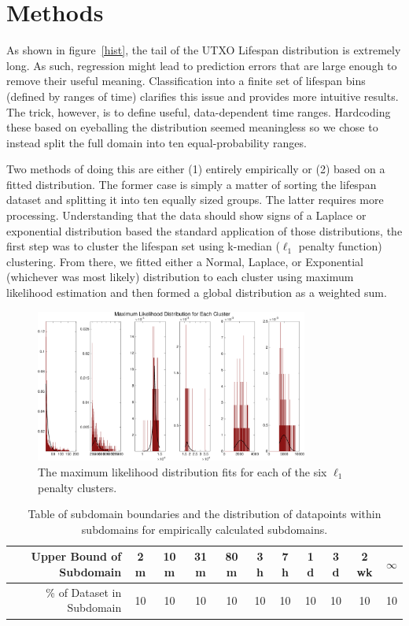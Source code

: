 \documentclass[11pt]{article}
\begin{document}
\section{Methods}
As shown in figure~\ref{hist}, the tail of the UTXO Lifespan distribution is extremely long. As such, regression might lead to prediction errors that are large enough to remove their useful meaning. Classification into a finite set of lifespan bins (defined by ranges of time) clarifies this issue and provides more intuitive results. The trick, however, is to define useful, data-dependent time ranges. Hardcoding these based on eyeballing the distribution seemed meaningless so we chose to instead split the full domain into ten equal-probability ranges.

Two methods of doing this are either (1) entirely empirically or (2) based on a fitted distribution. The former case is simply a matter of sorting the lifespan dataset and splitting it into ten equally sized groups. The latter requires more processing. Understanding that the data should show signs of a Laplace or exponential distribution based the standard application of those distributions, the first step was to cluster the lifespan set using k-median ($\ell_1$ penalty function) clustering. From there, we fitted either a Normal, Laplace, or Exponential (whichever was most likely) distribution to each cluster using maximum likelihood estimation and then formed a global distribution as a weighted sum. 

\begin{figure}
\begin{center}
\includegraphics[width=0.8\textwidth]{figures/fits}
\end{center}
\caption{The maximum likelihood distribution fits for each of the six $\ell_1$ penalty clusters.}
\label{fits}
\end{figure}

\begin{table}[!htbp]
\begin{tabular}{|r||c|c|c|c|c|c|c|c|c|c|}
\hline
Upper Bound of Subdomain & 2 m & 10 m & 31 m & 80 m & 3 h & 7 h & 1 d & 3 d & 2 wk & $\infty$\\
\hline
\% of Dataset in Subdomain & 10 & 10 & 10 & 10 & 10 & 10 & 10 & 10 & 10 & 10\\
\hline
\end{tabular}
\caption{Table of subdomain boundaries and the distribution of datapoints within subdomains for empirically calculated subdomains.}
\label{opt1}
\end{table}
\end{document}
